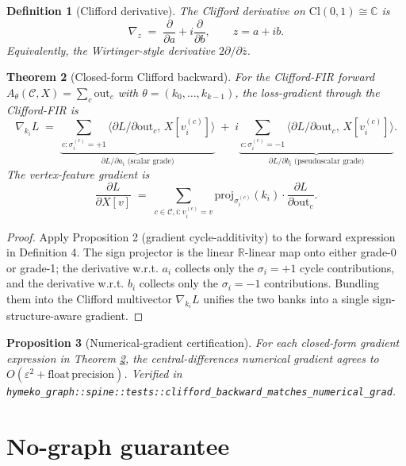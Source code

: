 \documentclass[11pt]{article}
\newtheorem{theorem}{Theorem}
\newtheorem{prop}[theorem]{Proposition}
\newtheorem{defn}[theorem]{Definition}
\begin{document}
\begin{defn}[Clifford derivative]
The \emph{Clifford derivative} on
$\mathrm{Cl}(0, 1) \cong \mathbb{C}$ is
\[
  \nabla_z \;=\; \frac{\partial}{\partial a} + i \frac{\partial}{\partial b},
  \qquad z = a + i b.
\]
Equivalently, the Wirtinger-style derivative $2 \partial / \partial \bar z$.
\end{defn}

\begin{theorem}[Closed-form Clifford backward]
\label{thm:clifford-bwd}
For the Clifford-FIR forward $A_\theta(\mathcal{C}, X) = \sum_c \mathrm{out}_c$
with $\theta = (k_0, \ldots, k_{k-1})$, the loss-gradient through
the Clifford-FIR is
\[
  \nabla_{k_i} L \;=\;
  \underbrace{\sum_{c: \sigma_i^{(c)} = +1}
              \big\langle \partial L / \partial \mathrm{out}_c,\, X[v_i^{(c)}] \big\rangle
              }_{\partial L / \partial a_i \text{ (scalar grade)}}
  \;+\; i
  \underbrace{\sum_{c: \sigma_i^{(c)} = -1}
              \big\langle \partial L / \partial \mathrm{out}_c,\, X[v_i^{(c)}] \big\rangle
              }_{\partial L / \partial b_i \text{ (pseudoscalar grade)}}.
\]
The vertex-feature gradient is
\[
  \frac{\partial L}{\partial X[v]}
  \;=\;
  \sum_{c \in \mathcal{C}, i : v_i^{(c)} = v}
        \mathrm{proj}_{\sigma_i^{(c)}}(k_i)
        \cdot \frac{\partial L}{\partial \mathrm{out}_c}.
\]
\end{theorem}

\begin{proof}
Apply Proposition 2 (gradient cycle-additivity) to the forward
expression in Definition 4. The sign projector is the linear
$\mathbb{R}$-linear map onto either grade-0 or grade-1; the
derivative w.r.t. $a_i$ collects only the $\sigma_i = +1$ cycle
contributions, and the derivative w.r.t. $b_i$ collects only the
$\sigma_i = -1$ contributions. Bundling them into the Clifford
multivector $\nabla_{k_i} L$ unifies the two banks into a single
sign-structure-aware gradient.
\end{proof}

\begin{prop}[Numerical-gradient certification]
For each closed-form gradient expression in Theorem
\ref{thm:clifford-bwd}, the central-differences numerical gradient
agrees to $O(\varepsilon^2 + \mathrm{float\,precision})$. Verified
in \texttt{hymeko\_graph::spine::tests::clifford\_backward\_matches\_numerical\_grad}.
\end{prop}

\section{No-graph guarantee}
\end{document}
